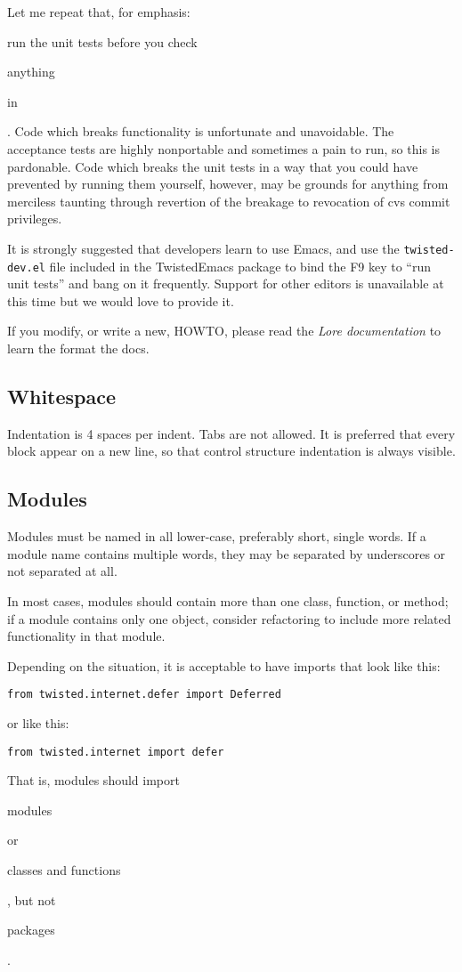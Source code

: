 Let me repeat that, for emphasis: \begin{em}run the unit tests before you         check \begin{em}anything\end{em} in\end{em}.  Code which breaks      functionality is unfortunate and unavoidable.  The acceptance tests     are highly nonportable and sometimes a pain to run, so this is pardonable.     Code which breaks the unit tests in a way that you could have prevented      by running them yourself, however, may be grounds for anything from      merciless taunting through revertion of the breakage to revocation      of cvs commit privileges.

It is strongly suggested that developers learn to use Emacs, and use      the \texttt{twisted-dev.\linebreak[1]el} file included in the TwistedEmacs      package to bind the F9 key to ``run unit tests'' and bang on it      frequently.  Support for other editors is unavailable at this time     but we would love to provide it.

If you modify, or write a new, HOWTO, please read the \textit{Lore documentation} to learn the format the docs.

\subsection{Whitespace}


Indentation is 4 spaces per indent. Tabs are not allowed. It     is preferred that every block appear on a new line, so that     control structure indentation is always visible.

\subsection{Modules}


Modules must be named in all lower-case, preferably short,     single words. If a module name contains multiple words, they     may be separated by underscores or not separated at all.

In most cases, modules should contain more than one class,     function, or method; if a module contains only one object,     consider refactoring to include more related functionality in     that module.

Depending on the situation, it is acceptable to have imports that        look like this:        \begin{verbatim}
from twisted.internet.defer import Deferred
\end{verbatim}
        or like this:         \begin{verbatim}
from twisted.internet import defer
\end{verbatim}
         That is, modules should import \begin{em}modules\end{em} or         \begin{em}classes and functions\end{em}, but not \begin{em}packages\end{em}.

